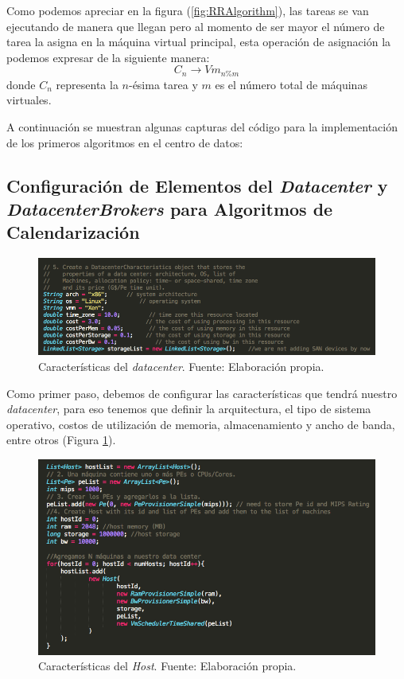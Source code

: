 Como podemos apreciar en la figura (\ref{fig:RRAlgorithm}), las tareas se van ejecutando de manera que llegan pero al momento de ser mayor el número de tarea la asigna en la máquina virtual principal, esta operación de asignación la podemos expresar de la siguiente manera: $$C_n \rightarrow Vm_{n \% m}$$ donde $C_n$ representa la $n$-ésima tarea y $m$ es el número total de máquinas virtuales.

\newpage
A continuaci\'on se muestran algunas capturas del c\'odigo para la implementaci\'on de los primeros algoritmos en el centro de datos:


\subsection*{Configuración de Elementos del \textit{Datacenter} y \textit{DatacenterBrokers} para Algoritmos de Calendarización}

\renewcommand\thefigure{\arabic{figure}}
\begin{figure}[h!]
	\centering
	\includegraphics[scale=0.4]{media/caracteristicas_datacenter}
	\caption{Características del \textit{datacenter}. Fuente: Elaboración propia.}
	\label{fig:DCar}
\end{figure}


Como primer paso,  debemos de configurar las caracter\'isticas que tendrá nuestro \textit{datacenter}, para eso tenemos que definir la arquitectura, el tipo de sistema operativo, costos de utilizaci\'on de memoria, almacenamiento y ancho de banda, entre otros (Figura \ref{fig:DCar}).

\newpage

\renewcommand\thefigure{\arabic{figure}}
\begin{figure}[h!]
	\centering
	\includegraphics[scale=0.5]{media/caracteristicas_host}
	\caption{Características del \textit{Host}. Fuente: Elaboración propia.}
	\label{fig:HCar}
	
\end{figure}

